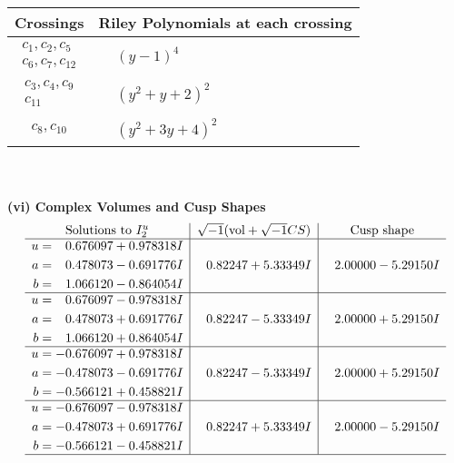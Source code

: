 \documentclass[1p]{elsarticle_modified}
\theoremstyle{definition}
\newcommand{\I}{\sqrt{-1}}
\begin{document}
\begin{tabular}{m{50pt}|m{274pt}}
Crossings & \hspace{64pt}Riley Polynomials at each crossing \\
\hline $$\begin{aligned}c_{1},c_{2},c_{5}\\c_{6},c_{7},c_{12}\end{aligned}$$&$\begin{aligned}
&(y-1)^4
\end{aligned}$\\
\hline $$\begin{aligned}c_{3},c_{4},c_{9}\\c_{11}\end{aligned}$$&$\begin{aligned}
&(y^2+y+2)^2
\end{aligned}$\\
\hline $$\begin{aligned}c_{8},c_{10}\end{aligned}$$&$\begin{aligned}
&(y^2+3 y+4)^2
\end{aligned}$\\
\hline
\end{tabular}\\~\\
\newpage\flushleft \textbf{(vi) Complex Volumes and Cusp Shapes}
$$\begin{array}{c|c|c}  
\text{Solutions to }I^u_{2}& \I (\text{vol} + \sqrt{-1}CS) & \text{Cusp shape}\\
 \hline 
\begin{aligned}
u &= \phantom{-}0.676097 + 0.978318 I \\
a &= \phantom{-}0.478073 - 0.691776 I \\
b &= \phantom{-}1.066120 - 0.864054 I\end{aligned}
 & \phantom{-}0.82247 + 5.33349 I & \phantom{-}2.00000 - 5.29150 I \\ \hline\begin{aligned}
u &= \phantom{-}0.676097 - 0.978318 I \\
a &= \phantom{-}0.478073 + 0.691776 I \\
b &= \phantom{-}1.066120 + 0.864054 I\end{aligned}
 & \phantom{-}0.82247 - 5.33349 I & \phantom{-}2.00000 + 5.29150 I \\ \hline\begin{aligned}
u &= -0.676097 + 0.978318 I \\
a &= -0.478073 - 0.691776 I \\
b &= -0.566121 + 0.458821 I\end{aligned}
 & \phantom{-}0.82247 - 5.33349 I & \phantom{-}2.00000 + 5.29150 I \\ \hline\begin{aligned}
u &= -0.676097 - 0.978318 I \\
a &= -0.478073 + 0.691776 I \\
b &= -0.566121 - 0.458821 I\end{aligned}
 & \phantom{-}0.82247 + 5.33349 I & \phantom{-}2.00000 - 5.29150 I\\
 \hline 
 \end{array}$$\newpage\newpage\renewcommand{\arraystretch}{1}
\end{document}
